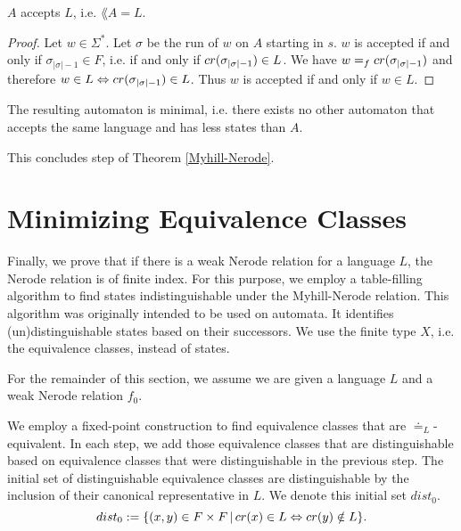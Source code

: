 \begin{theorem}
    \label{nerode_to_dfa_correct}
    $A$ accepts $L$, i.e. $\lang{A} = L$.
\end{theorem}
\begin{proof}
    Let $w \in \Sigma^*$. Let $\sigma$ be the run of $w$ on $A$ starting in $s$. 
    $w$ is accepted if and only if $\sigma_{|\sigma|-1} \in F$, i.e. if and only if $cr(\sigma_{|\sigma|-1}) \in L$.
    We have $w =_f cr(\sigma_{|\sigma|-1})$ and therefore $w \in L \Leftrightarrow cr(\sigma_{|\sigma|-1}) \in L$.
    Thus $w$ is accepted if and only if $w \in L$.
\end{proof}

The resulting automaton is minimal, i.e. there exists no other automaton that accepts the same language and has less states than $A$.

This concludes step  of Theorem \ref{Myhill-Nerode}.

\section{Minimizing Equivalence Classes}
Finally, we prove that if there is a weak Nerode relation for a language $L$, the Nerode relation is of finite index.
For this purpose, we employ a table-filling algorithm \cite{Huffman1954161} to find states indistinguishable under the Myhill-Nerode relation. 
This algorithm was originally intended to be used on automata. 
It identifies (un)distinguishable states based on their successors.
We use the finite type $X$, i.e. the equivalence classes, instead of states.


For the remainder of this section, we assume we are given a language $L$ and a weak Nerode relation $f_0$. 


We employ a fixed-point construction to find equivalence classes that are $\doteq_L$-equivalent.
In each step, we add those equivalence classes that are distinguishable based on equivalence classes that were distinguishable in the previous step.
The initial set of distinguishable equivalence classes are distinguishable by the inclusion of their canonical representative in $L$. 
We denote this initial set $\mathit{dist_0}$.
\begin{equation*}
    dist_0 := \{ (x,y)  \in F \times F \, | \, cr(x) \in L \Leftrightarrow cr(y) \notin L\}.
\end{equation*}

